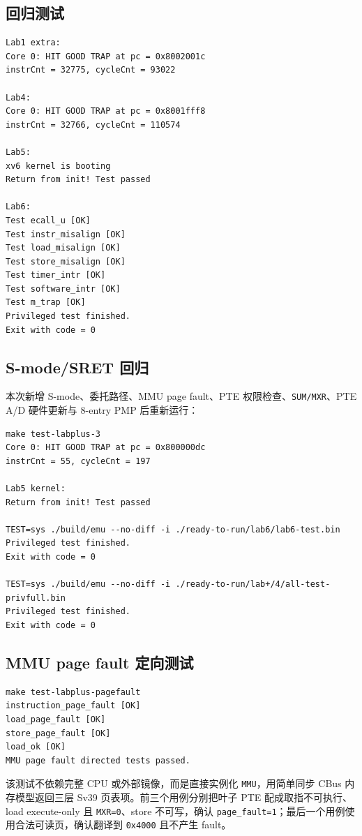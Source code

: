 \documentclass[UTF8,a4paper,11pt]{ctexart}
\begin{document}
\subsection{回归测试}

\begin{Verbatim}[fontsize=\small]
Lab1 extra:
Core 0: HIT GOOD TRAP at pc = 0x8002001c
instrCnt = 32775, cycleCnt = 93022

Lab4:
Core 0: HIT GOOD TRAP at pc = 0x8001fff8
instrCnt = 32766, cycleCnt = 110574

Lab5:
xv6 kernel is booting
Return from init! Test passed

Lab6:
Test ecall_u [OK]
Test instr_misalign [OK]
Test load_misalign [OK]
Test store_misalign [OK]
Test timer_intr [OK]
Test software_intr [OK]
Test m_trap [OK]
Privileged test finished.
Exit with code = 0
\end{Verbatim}

\subsection{S-mode/SRET 回归}

本次新增 S-mode、委托路径、MMU page fault、PTE 权限检查、\texttt{SUM/MXR}、PTE A/D 硬件更新与 8-entry PMP 后重新运行：

\begin{Verbatim}[fontsize=\small]
make test-labplus-3
Core 0: HIT GOOD TRAP at pc = 0x800000dc
instrCnt = 55, cycleCnt = 197

Lab5 kernel:
Return from init! Test passed

TEST=sys ./build/emu --no-diff -i ./ready-to-run/lab6/lab6-test.bin
Privileged test finished.
Exit with code = 0

TEST=sys ./build/emu --no-diff -i ./ready-to-run/lab+/4/all-test-privfull.bin
Privileged test finished.
Exit with code = 0
\end{Verbatim}

\subsection{MMU page fault 定向测试}

\begin{Verbatim}[fontsize=\small]
make test-labplus-pagefault
instruction_page_fault [OK]
load_page_fault [OK]
store_page_fault [OK]
load_ok [OK]
MMU page fault directed tests passed.
\end{Verbatim}

该测试不依赖完整 CPU 或外部镜像，而是直接实例化 \texttt{MMU}，用简单同步 CBus 内存模型返回三层 Sv39 页表项。前三个用例分别把叶子 PTE 配成取指不可执行、load execute-only 且 \texttt{MXR=0}、store 不可写，确认 \texttt{page\_fault=1}；最后一个用例使用合法可读页，确认翻译到 \texttt{0x4000} 且不产生 fault。
\end{document}
